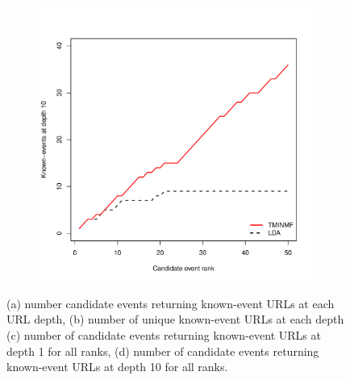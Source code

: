 \documentclass{sig-alternate}
\begin{document}
\begin{figure}[!ht]
\begin{subfigure}{.5\textwidth}
\end{subfigure}%
\begin{subfigure}{.5\textwidth}
  \centering
\includegraphics[width=9cm]{plots/events_at_rank_10.pdf}
\end{subfigure}
\caption{(a) number candidate events returning known-event URLs at each URL depth, (b) number of unique known-event URLs at each depth (c) number of candidate events returning known-event URLs at depth 1 for all ranks, (d)  number of candidate events returning known-event URLs at depth 10 for all ranks.}
\label{fig.eventdist}
\end{figure}
\end{document}
